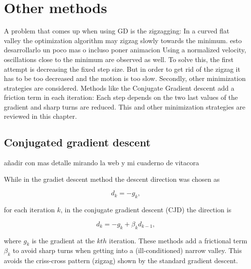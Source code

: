 \section{Other methods}
\label{sec:othermethods}



\label{subsubsec:zigzag}


A problem that comes up when using GD is the zigzagging: In a curved flat valley the optimization algorithm may zigzag slowly towards the minimum. {\color{red} esto desarrollarlo un poco mas o incluso poner animacion} Using a normalized velocity, oscillations close to the minimum are observed as well. 
To solve this, the first attempt is decreasing the fixed step size. But in order to get rid of the zigzag it has to be too decreased and the motion is too slow.
Secondly, other minimization strategies are considered. Methods like the Conjugate Gradient descent add a friction term in each iteration: Each step depends on the two last values of the gradient and sharp turns are reduced. This and other minimization strategies are reviewed in this chapter.



\subsection{Conjugated gradient descent}
\label{subsec:CJD}

{\color{red} añadir con mas detalle mirando la web y mi cuaderno de vitacora} 


While in the gradiet descent method the descent direction was chosen as 

\begin{equation}
d_k = -g_k ,
\end{equation} 

for each iteration $k$, in the conjugate gradient descent (CJD) the direction is

\begin{equation}
d_k = -g_k + \beta_k d_{k-1},
\end{equation}

where $g_k$ is the gradient at the $kth$ iteration. These methods add a frictional term $\beta_k$ to avoid sharp turns when getting into a (ill-conditioned) narrow valley. This avoids the criss-cross pattern (zigzag) shown by the standard gradient descent.

